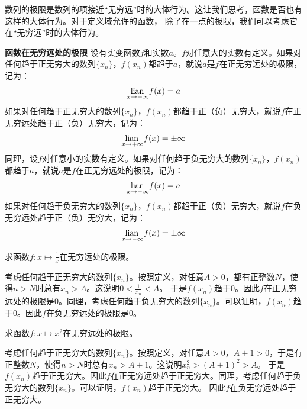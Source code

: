 \documentclass[12pt,UTF8]{ctexbook}
\begin{document}
数列的极限是数列的项接近“无穷远”时的大体行为。这让我们思考，函数是否也有这样的大体行为。对于定义域允许的函数，
除了在一点的极限，我们可以考虑它在“无穷远”时的大体行为。

\begin{df}{\textbf{函数在无穷远处的极限}}
    设有实变函数$f$和实数$a$。$f$对任意大的实数有定义。如果对任何趋于正无穷大的数列$\{x_n\}$，$f(x_n)$都趋于$a$，就说$a$是$f$在正无穷远处的极限，
    记为：
    $$ \underset{x\to +\infty}{\operatorname{lian}\,} f(x) = a$$
    如果对任何趋于正无穷大的数列$\{x_n\}$，$f(x_n)$都趋于正（负）无穷大，就说$f$在正无穷远处趋于正（负）无穷大，记为：
    $$ \underset{x\to +\infty}{\operatorname{lian}\,} f(x) = \pm\infty$$
    同理，设$f$对任意小的实数有定义。如果对任何趋于负无穷大的数列$\{x_n\}$，$f(x_n)$都趋于$a$，就说$a$是$f$在正无穷远处的极限，记为：
    $$ \underset{x\to -\infty}{\operatorname{lian}\,} f(x) = a$$
    如果对任何趋于负无穷大的数列$\{x_n\}$，$f(x_n)$都趋于正（负）无穷大，就说$f$在负无穷远处趋于正（负）无穷大，记为：
    $$ \underset{x\to -\infty}{\operatorname{lian}\,} f(x) = \pm\infty$$
\end{df}

\begin{et}
    求函数$f:x\mapsto \displaystyle\frac{1}{x}$在无穷远处的极限。
\end{et}
\begin{so}
    考虑任何趋于正无穷大的数列$\{x_n\}$。按照定义，对任意$A>0$，都有正整数$N$，使得$n>N$时总有$x_n > A$。这说明$0 < \frac{1}{x_n} < A$。
    于是$f(x_n)$趋于$0$。因此$f$在正无穷远处的极限是$0$。同理，考虑任何趋于负无穷大的数列$\{x_n\}$。可以证明，$f(x_n)$趋于$0$。因此$f$在负无穷远处的极限是$0$。
\end{so}

\begin{et}
    求函数$f:x\mapsto x^2$在无穷远处的极限。
\end{et}
\begin{so}
    考虑任何趋于正无穷大的数列$\{x_n\}$。按照定义，对任意$A>0$，$A+1>0$，于是有正整数$N$，使得$n>N$时总有$x_n > A+1$。这说明$x_n^2 > (A+1)^2 > A$。
    于是$f(x_n)$趋于正无穷大。因此$f$在正无穷远处趋于正无穷大。同理，考虑任何趋于负无穷大的数列$\{x_n\}$。可以证明，$f(x_n)$趋于正无穷大。
    因此$f$在负无穷远处趋于正无穷大。
\end{so}

\end{document}
